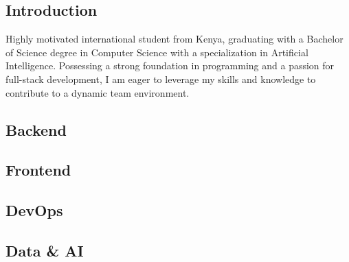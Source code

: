 \documentclass{modernsimplecv}
\newlength{\rightcolwidth}
\begin{document}
\begin{paracol}{2}
\section{Introduction} 
{\small
Highly motivated international student from Kenya, graduating with a Bachelor of Science degree in Computer Science with a specialization in Artificial Intelligence. Possessing a strong foundation in programming and a passion for full-stack development, I am eager to leverage my skills and knowledge to contribute to a dynamic team environment.
}
\bigskip


\subsection*{Backend}

\begin{skillsection}{\rightcolwidth}
\end{skillsection}

\subsection*{Frontend}

\begin{skillsection}{\rightcolwidth}
\end{skillsection}

\subsection*{DevOps}

\begin{skillsection}{\rightcolwidth}
\end{skillsection}

\subsection*{Data \& AI}



\end{paracol}
\end{document}
